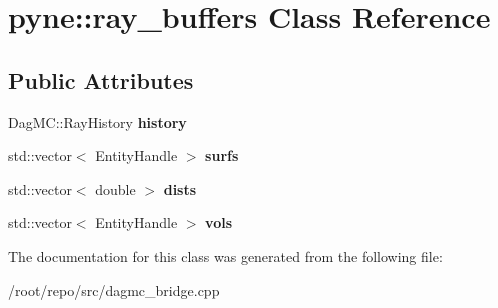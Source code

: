 \hypertarget{classpyne_1_1ray__buffers}{}\section{pyne\+:\+:ray\+\_\+buffers Class Reference}
\label{classpyne_1_1ray__buffers}
\subsection*{Public Attributes}
\begin{DoxyCompactItemize}
\item 
\mbox{\label{classpyne_1_1ray__buffers_adb3331dbf290b1c6d44c37931a917a7e}} 
Dag\+M\+C\+::\+Ray\+History {\bfseries history}
\item 
\mbox{\label{classpyne_1_1ray__buffers_ac2a784c86703f7253861ceaa73ba5e6b}} 
std\+::vector$<$ Entity\+Handle $>$ {\bfseries surfs}
\item 
\mbox{\label{classpyne_1_1ray__buffers_a2904cd95dd5c1cb04ca796cf025bced1}} 
std\+::vector$<$ double $>$ {\bfseries dists}
\item 
\mbox{\label{classpyne_1_1ray__buffers_a2d059fcf9432e03b28eade60308b2498}} 
std\+::vector$<$ Entity\+Handle $>$ {\bfseries vols}
\end{DoxyCompactItemize}


The documentation for this class was generated from the following file\+:\begin{DoxyCompactItemize}
\item 
/root/repo/src/dagmc\+\_\+bridge.\+cpp\end{DoxyCompactItemize}
